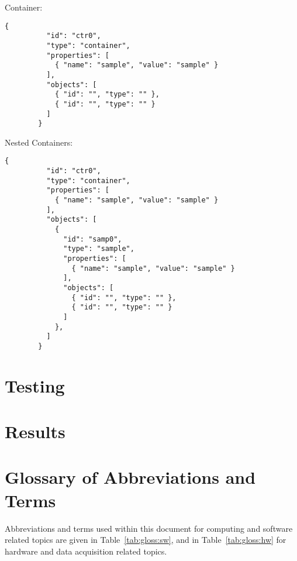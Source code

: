 \documentclass[11pt]{article}
\begin{document}
      Container:

      \begin{lstlisting}[caption={Container Configuration in JSON},label={lst:cfg-json-ctr}]
        {
          "id": "ctr0",
          "type": "container",
          "properties": [
            { "name": "sample", "value": "sample" }
          ],
          "objects": [
            { "id": "", "type": "" },
            { "id": "", "type": "" }
          ]
        }
      \end{lstlisting}

      Nested Containers:

      \begin{lstlisting}[caption={Nested Container Configuration in JSON},label={lst:cfg-json-ctr}]
        {
          "id": "ctr0",
          "type": "container",
          "properties": [
            { "name": "sample", "value": "sample" }
          ],
          "objects": [
            {
              "id": "samp0",
              "type": "sample",
              "properties": [
                { "name": "sample", "value": "sample" }
              ],
              "objects": [
                { "id": "", "type": "" },
                { "id": "", "type": "" }
              ]
            },
          ]
        }
      \end{lstlisting}

  \section{Testing}\label{sec:test}

  \section{Results}\label{sec:res}


  \newpage
  \addappheadtotoc%
  \appendix
  \appendixpage%

  \section{Glossary of Abbreviations and Terms}\label{app:glossary}

    Abbreviations and terms used within this document for computing and
    software related topics are given in Table~\ref{tab:gloss:sw}, and in
    Table~\ref{tab:gloss:hw} for hardware and data acquisition related topics.
\end{document}
